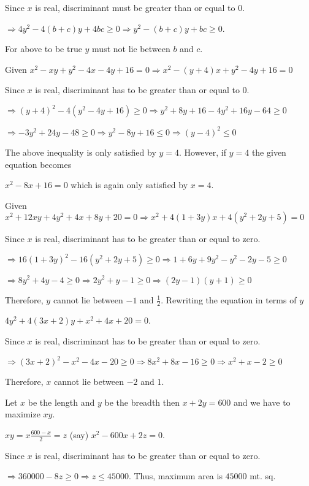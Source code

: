   Since $x$ is real, discriminant must be greater than or equal to $0$.

  $\Rightarrow 4y^2 - 4(b + c)y + 4bc \ge 0\Rightarrow y^2 - (b + c)y + bc \ge 0$.

  For above to be true $y$ must not lie between $b$ and $c$.
\item Given $x^2 - xy + y^2 - 4x - 4y + 16 = 0\Rightarrow x^2 - (y + 4)x + y^2 - 4y + 16 = 0$

  Since $x$ is real, discriminant has to be greater than or equal to $0$.

  $\Rightarrow (y + 4)^2 - 4(y^2 - 4y + 16) \ge 0\Rightarrow y^2 + 8y + 16 - 4y^2 + 16y - 64 \ge 0$

  $\Rightarrow -3y^2 + 24y - 48 \ge 0\Rightarrow y^2 - 8y + 16 \le 0\Rightarrow (y - 4)^2 \le 0$

  The above inequality is only satisfied by $y = 4$. However, if $y = 4$ the given equation becomes

  $x^2 - 8x + 16 = 0$ which is again only satisfied by $x = 4$.
\item Given $x^2 + 12xy + 4y^2 + 4x + 8y + 20 = 0\Rightarrow x^2 + 4(1 + 3y)x + 4(y^2 + 2y + 5) = 0$

  Since $x$ is real, discriminant has to be greater than or equal to zero.

  $\Rightarrow 16(1 + 3y)^2 - 16(y^2 + 2y + 5) \ge 0\Rightarrow 1 + 6y + 9y^2 - y^2 - 2y - 5 \ge 0$

  $\Rightarrow 8y^2 + 4y - 4 \ge 0\Rightarrow 2y^2 + y - 1 \ge 0 \Rightarrow (2y - 1)(y + 1) \ge 0$

  Therefore, $y$ cannot lie between $-1$ and $\frac{1}{2}$. Rewriting the equation in terms of $y$

  $4y^2 + 4(3x + 2)y + x^2 + 4x + 20 = 0$.

  Since $x$ is real, discriminant has to be greater than or equal to zero.

  $\Rightarrow (3x + 2)^2 - x^2 - 4x - 20 \ge 0\Rightarrow 8x^2 + 8x - 16 \ge 0 \Rightarrow x^2 + x - 2 \ge
  0$

  Therefore, $x$ cannot lie between $-2$ and $1$.
\item Let $x$ be the length and $y$ be the breadth then $x + 2y = 600$ and we have to maximize $xy$.

  $xy = x\frac{600 - x}{2} = z$ (say) $x^2 - 600x + 2z = 0$.

  Since $x$ is real, discriminant has to be greater than or equal to zero.

  $\Rightarrow 360000 - 8z \ge 0\Rightarrow z \le 45000$. Thus, maximum area is $45000$ mt. sq.

